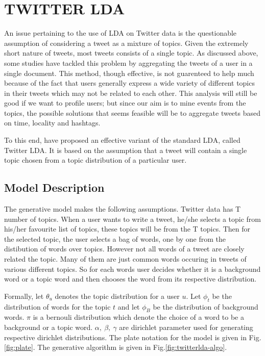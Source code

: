 
\section{\uppercase{Twitter LDA}}
An issue pertaining to the use of LDA on Twitter data is the questionable assumption of considering a tweet as a mixture of topics. Given the extremely short nature of tweets, most tweets consists of a single topic. As discussed above, some studies have tackled this problem by aggregating the tweets of a user in a single document. This method, though effective, is not guarenteed to help much because of the fact that users generally express a wide variety of different topics in their tweets which may not be related to each other. This analysis will still be good if we want to profile users; but since our aim is to mine events from the topics, the possible solutions that seems feasible will be to aggregate tweets based on time, locality and hashtags.

To this end, \cite{zhao2011comparing} have proposed an effective variant of the standard LDA, called Twitter LDA. It is based on the assumption that a tweet will contain a single topic chosen from a topic distribution of a particular user. 

\subsection{Model Description} 
The generative model makes the following assumptions. Twitter data has T number of topics. When a user wants to write a tweet, he/she selects a topic from his/her favourite list of topics, these topics will be from the T topics. Then for the selected topic, the user selects a bag of words, one by one from the distibution of words over topics. However not all words of a tweet are closely related the topic. Many of them are just common words occuring in tweets of various different topics. So for each words user decides whether it is a background word or a topic word and then chooses the word from its respective distribution.

Formally, let $\theta_u$ denotes the topic distribution for a user $u$. Let $\phi_t$ be the distribution of words for the topic $t$ and let $\phi_B$ be the distribution of background words. $\pi$ is a bernouli distribution which denote the choice of a word to be a background or a topic word. $\alpha,~\beta,~\gamma$ are dirichlet parameter used for generating respective dirichlet distributions. The plate notation for the model is given in Fig.\ref{fig:plate}. The generative algorithm is given in Fig.\ref{fig:twitterlda-algo}.

